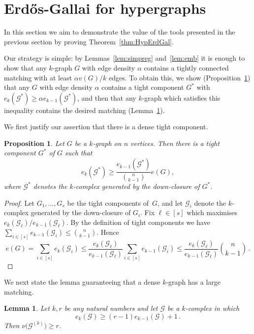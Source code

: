 \documentclass[12pt,a4paper]{amsart}
\newtheorem{lemma}[theorem] {Lemma}
\newtheorem{proposition}[theorem] {Proposition}
\newcommand{\cG}{\mathcal{G}}
\begin{document}
\section{Erd\H{o}s-Gallai for hypergraphs}\label{sec:EG} 
In this section we aim to demonstrate the value of the tools presented
in the previous section by proving Theorem~\ref{thm:HypErdGal}.

Our strategy is simple: by Lemmas~\ref{lem:simpreg} and~\ref{lem:emb} it is
enough to show that any $k$-graph $G$ with edge density $\alpha$ contains a
tightly connected matching with at least $\alpha v(G)/k$ edges. To obtain this, we show (Proposition~\ref{prop:comp}) that any $G$ with edge density $\alpha$ contains a tight component $G^*$ with $e_k(\cG^*)\ge\alpha e_{k-1}(\cG^*)$, and then that any $k$-graph which satisfies this inequality contains the desired matching (Lemma~\ref{lem:ratiomatching}).

We first justify our assertion that there is a dense tight component.

\begin{proposition}\label{prop:comp}
Let $G$ be a $k$-graph on $n$ vertices. Then there is a tight component $G^*$ of $G$ such that  
  \begin{equation*}
    e_k(\cG^*)\ge\frac{e_{k-1}(\cG^*)}{\binom{n}{k-1}} e(G),
  \end{equation*}
  where $\cG^*$ denotes the $k$-complex generated by the down-closure of $G^*$.
\end{proposition}
\begin{proof}
  Let $G_1,\dots,G_s$ be the tight components of~$G$, and let $\cG_i$ denote 
 the $k$-complex generated by the down-closure of $G_i$. Fix $\ell \in [s]$ 
  which maximises $e_k(\cG_\ell)/e_{k-1}(\cG_\ell)$. 
  By the definition of tight components we have
  $\sum_{i\in[s]}e_{k-1}(\cG_i)\le\binom{n}{k-1}$. Hence
  \begin{equation*}
      e(G)= \sum_{i\in[s]} e_k(\cG_i) 
      \le \frac{e_k(\cG_\ell)}{e_{k-1}(\cG_\ell)}\sum_{i\in[s]} e_{k-1}(\cG_i) 
      \le \frac{e_k(\cG_\ell)}{e_{k-1}(\cG_\ell)} \binom{n}{k-1} \,.
  \end{equation*} 
\end{proof}

We next state the lemma guaranteeing that a dense $k$-graph has a large matching.

\begin{lemma}\label{lem:ratiomatching}
  Let $k,r$ be any natural numbers and let
  $\cG$ be a $k$-complex in which
  \begin{equation}\label{eq:ratio}
   e_k(\cG)\geq (r-1)e_{k-1}(\cG)+1\,.
  \end{equation}
  Then $\nu\big(\cG^{(k)}\big)\ge r$.
\end{lemma}
\end{document}
